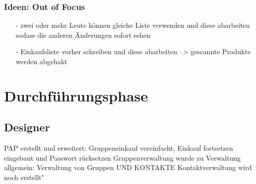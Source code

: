 \documentclass[12pt,a4paper]{article}
\begin{document}
\subsubsection*{Ideen: Out of Focus}
\begin{itemize}
\item[-] zwei oder mehr Leute können gleiche Liste verwenden und diese abarbeiten sodass die anderen Änderungen sofort sehen
\item[-] Einkaufsliste vorher schreiben und diese abarbeiten --> gescannte Produkte werden abgehakt
\end{itemize}

\newpage

\newpage

\section{Durchführungsphase}
\subsection{Designer}
PAP erstellt und erweitert:
Gruppeneinkauf vereinfacht, Einkauf fortsetzen eingebaut und Passwort rücksetzen
Gruppenverwaltung wurde zu Verwaltung allgemein:  Verwaltung von Gruppen UND KONTAKTE 
Kontaktverwaltung wird noch erstellt"

\newpage
\end{document}
